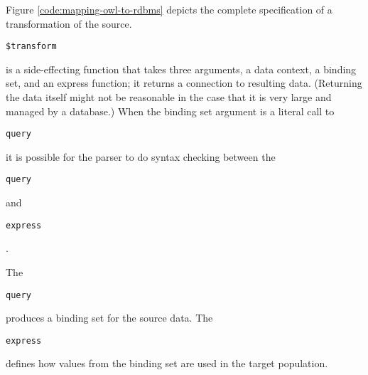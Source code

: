 \documentclass[9pt,letterpaper]{article}
\newcommand{\stt}[1]{\begin{footnotesize}\texttt{#1}\end{footnotesize}}
\begin{document}
%

Figure \ref{code:mapping-owl-to-rdbms} depicts the complete specification of a transformation of the source.
\stt{\$transform} is a side-effecting function that takes three arguments, a data context, a binding set, and an express function;
it returns a connection to resulting data.
(Returning the data itself might not be reasonable in the case that it is very large and managed by a database.)
When the binding set argument is a literal call to \stt{query} it is possible for the parser to do syntax checking between
the \stt{query} and \stt{express}.

The \stt{query} produces a binding set for the source data.
The \stt{express} defines how values from the binding set are used in the target population.

\end{document}
